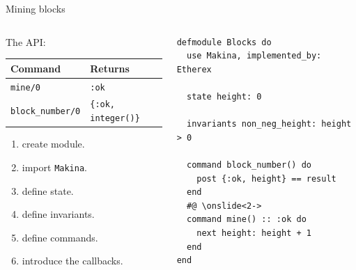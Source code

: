 \documentclass[aspectratio=169, 10pt]{beamer}
\begin{document}
\begin{frame}[label={sec:org0637cdf},fragile]{Mining blocks}
 \begin{columns}
\begin{column}{0.48\columnwidth}
The API:

\begin{center}
\begin{tabular}{ll}
Command & Returns\\
\hline
\texttt{mine/0} & \texttt{:ok}\\
\texttt{block\_number/0} & \texttt{\{:ok, integer()\}}\\
\end{tabular}
\end{center}

\vspace{10pt}
\begin{enumerate}
\item create module.
\item import \texttt{Makina}.
\item define state.
\item define invariants.
\item define commands.
\item introduce the callbacks.
\end{enumerate}
\end{column}

\begin{column}{0.48\columnwidth}
\lstset{language=elixir,label= ,caption= ,captionpos=b,numbers=none,style=display}
\begin{lstlisting}
defmodule Blocks do
  use Makina, implemented_by: Etherex

  state height: 0

  invariants non_neg_height: height > 0

  command block_number() do
    post {:ok, height} == result
  end
  #@ \onslide<2->
  command mine() :: :ok do
    next height: height + 1
  end
end
\end{lstlisting}
\end{column}
\end{columns}
\end{frame}
\end{document}
